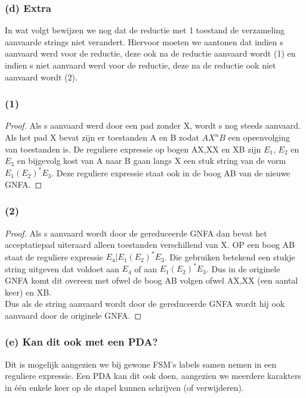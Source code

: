\subsubsection*{(d) Extra}
In wat volgt bewijzen we nog dat de reductie met 1 toestand de verzameling aanvaarde strings niet verandert. Hiervoor moeten we aantonen dat indien s aanvaard werd voor de reductie, deze ook na de reductie aanvaard wordt (1) en indien s niet aanvaard werd voor de reductie, deze na de reductie ook niet aanvaard wordt (2).\\
\subsubsection*{(1)}
\begin{proof}
Als s aanvaard werd door een pad zonder X, wordt s nog steeds aanvaard. Als het pad X bevat zijn er toestanden A en B zodat $AX^n B$ een opeenvolging van toestanden is. De reguliere expressie op bogen AX,XX en XB zijn $E_1$, $E_2$ en $E_3$ en bijgevolg kost van A naar B gaan langs X een stuk string van de vorm $E_1  (E_2)^* E_3$. Deze reguliere expressie staat ook in de boog AB van de nieuwe GNFA.
\end{proof}
\subsubsection*{(2)}
\begin{proof}
Als s aanvaard wordt door de gereduceerde GNFA dan bevat het acceptatiepad uiteraard alleen toestanden verschillend van X. OP een boog AB staat de reguliere expressie $E_4 | E_1 (E_2)^* E_3$. Die gebruiken betekend een stukje string uitgeven dat voldoet aan $E_4$ of aan $E_1 (E_2)^* E_3$. Dus in de originele GNFA komt dit overeen met ofwel de boog AB volgen ofwel AX,XX (een aantal keer) en XB.\\
Dus als de string aanvaard wordt door de gereduceerde GNFA wordt hij ook aanvaard door de originele GNFA.
\end{proof}

\subsubsection*{(e) Kan dit ook met een PDA?}
Dit is mogelijk aangezien we bij gewone FSM's labels samen nemen in een reguliere expressie. Een PDA kan dit ook doen, aangezien we meerdere karakters in \'e\'en enkele keer op de stapel kunnen schrijven (of verwijderen).
